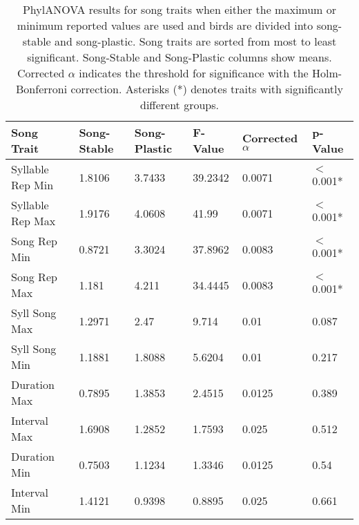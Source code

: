 \documentclass[a4paper,12pt]{article}
\begin{document}
\newcommand{\beginsupplement}{%
        \setcounter{table}{0}
        \renewcommand{\thetable}{S\arabic{table}}%
        \setcounter{figure}{0}
        \renewcommand{\thefigure}{S\arabic{figure}}%
     }

\beginsupplement





\begin{table}[ht]
\caption{PhylANOVA results for song traits when either the maximum or minimum reported values are used and birds are divided into song-stable and song-plastic. Song traits are sorted from most to least significant. Song-Stable and Song-Plastic columns show means. Corrected $\alpha$ indicates the threshold for significance with the Holm-Bonferroni correction. Asterisks (*) denotes traits with significantly different groups.}
\centering
\begin{tabular}{llllll}
  \hline
Song Trait & Song-Stable & Song-Plastic & F-Value & Corrected $\alpha$ & p-Value \\ 
  \hline
Syllable Rep Min & 1.8106 & 3.7433 & 39.2342 & 0.0071 & $<$0.001* \\ 
  Syllable Rep Max & 1.9176 & 4.0608 & 41.99 & 0.0071 & $<$0.001* \\ 
  Song Rep Min & 0.8721 & 3.3024 & 37.8962 & 0.0083 & $<$0.001* \\ 
  Song Rep Max & 1.181 & 4.211 & 34.4445 & 0.0083 & $<$0.001* \\ 
  Syll Song Max & 1.2971 & 2.47 & 9.714 & 0.01 & 0.087 \\ 
  Syll Song Min & 1.1881 & 1.8088 & 5.6204 & 0.01 & 0.217 \\ 
  Duration Max & 0.7895 & 1.3853 & 2.4515 & 0.0125 & 0.389 \\ 
  Interval Max & 1.6908 & 1.2852 & 1.7593 & 0.025 & 0.512 \\ 
  Duration Min & 0.7503 & 1.1234 & 1.3346 & 0.0125 & 0.54 \\ 
  Interval Min & 1.4121 & 0.9398 & 0.8895 & 0.025 & 0.661 \\ 
   \hline
\end{tabular}
\end{table}
\end{document}
